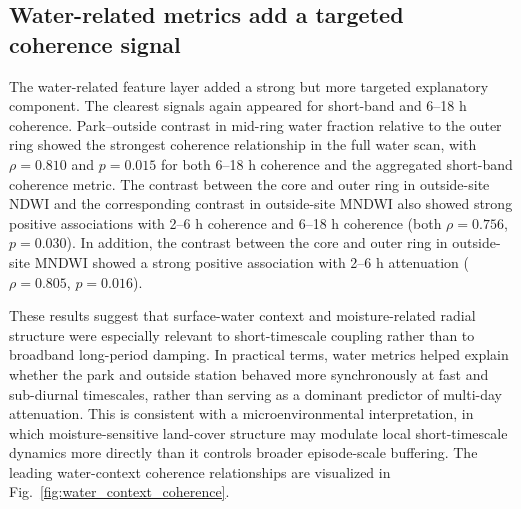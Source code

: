 
\subsection{Water-related metrics add a targeted coherence signal}

The water-related feature layer added a strong but more targeted explanatory component. The clearest signals again appeared for short-band and 6--18 h coherence. Park--outside contrast in mid-ring water fraction relative to the outer ring showed the strongest coherence relationship in the full water scan, with $\rho = 0.810$ and $p = 0.015$ for both 6--18 h coherence and the aggregated short-band coherence metric. The contrast between the core and outer ring in outside-site NDWI and the corresponding contrast in outside-site MNDWI also showed strong positive associations with 2--6 h coherence and 6--18 h coherence (both $\rho = 0.756$, $p = 0.030$). In addition, the contrast between the core and outer ring in outside-site MNDWI showed a strong positive association with 2--6 h attenuation ($\rho = 0.805$, $p = 0.016$).

These results suggest that surface-water context and moisture-related radial structure were especially relevant to short-timescale coupling rather than to broadband long-period damping. In practical terms, water metrics helped explain whether the park and outside station behaved more synchronously at fast and sub-diurnal timescales, rather than serving as a dominant predictor of multi-day attenuation. This is consistent with a microenvironmental interpretation, in which moisture-sensitive land-cover structure may modulate local short-timescale dynamics more directly than it controls broader episode-scale buffering. The leading water-context coherence relationships are visualized in Fig.~\ref{fig:water_context_coherence}.

